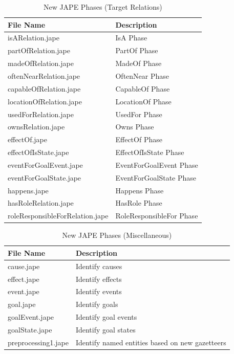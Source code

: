 \begin{table}[H]   %
\centering
\caption{New JAPE Phases (Target Relations)} \vspace{0.25em}
\begin{tabular}{|p{6cm}|p{5cm}|} \hline
File Name & Description \\ \hline
isARelation.jape					& IsA Phase \\ \hline
partOfRelation.jape					& PartOf Phase \\ \hline
madeOfRelation.jape					& MadeOf Phase \\ \hline
oftenNearRelation.jape				& OftenNear Phase \\ \hline
capableOfRelation.jape				& CapableOf Phase \\ \hline
locationOfRelation.jape				& LocationOf Phase \\ \hline
usedForRelation.jape				& UsedFor Phase \\ \hline
ownsRelation.jape 					& Owns Phase \\ \hline
effectOf.jape						& EffectOf Phase \\ \hline
effectOfIsState.jape				& EffectOfIsState Phase \\ \hline
eventForGoalEvent.jape				& EventForGoalEvent Phase \\ \hline
eventForGoalState.jape				& EventForGoalState Phase \\ \hline
happens.jape						& Happens Phase \\ \hline
hasRoleRelation.jape				& HasRole Phase \\ \hline
roleResponsibleForRelation.jape		& RoleResponsibleFor Phase \\ \hline
\end{tabular}
\label{tab:newjaperel}
\end{table}

\begin{table}[H]   %
\centering
\caption{New JAPE Phases (Miscellaneous)} \vspace{0.25em}
\begin{tabular}{|p{5cm}|p{5cm}|} \hline
File Name & Description \\ \hline
cause.jape				& Identify causes \\ \hline
effect.jape				& Identify effects \\ \hline
event.jape				& Identify events \\ \hline
goal.jape				& Identify goals \\ \hline
goalEvent.jape			& Identify goal events \\ \hline
goalState.jape			& Identify goal states \\ \hline
preprocessing1.jape		& Identify named entities based on new gazetteers \\ \hline
\end{tabular}
\label{tab:newjapemisc}
\end{table}

